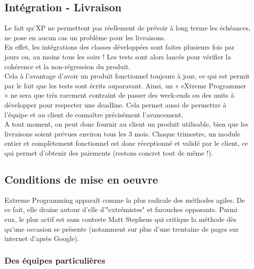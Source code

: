 \documentclass[]{article}
\begin{document}
\hypertarget{intuxe9gration---livraison}{%
\subsection{\texorpdfstring{\textbf{Intégration -
Livraison}}{Intégration - Livraison}}\label{intuxe9gration---livraison}}

Le fait qu'XP ne permettent pas réellement de prévoir à long terme les
échéances, ne pose en aucun cas un problème pour les livraisons.\\
En effet, les intégrations des classes développées sont faites plusieurs
fois par jours ou, au moins tous les soirs ! Les tests sont alors lancés
pour vérifier la cohérence et la non-régression du produit.\\
Cela à l'avantage d'avoir un produit fonctionnel toujours à jour, ce qui
est permit par le fait que les tests sont écrits auparavant. Ainsi, un «
eXtreme Programmer » ne sera que très rarement contraint de passer des
week-ends ou des nuits à développer pour respecter une deadline. Cela
permet aussi de permettre à l'équipe et au client de connaître
précisément l'avancement.\\
A tout moment, on peut donc fournir au client un produit utilisable,
bien que les livraisons soient prévues environ tous les 3 mois. Chaque
trimestre, un module entier et complètement fonctionnel est donc
réceptionné et validé par le client, ce qui permet d'obtenir des
paiements (restons concret tout de même !).




\hypertarget{conditions-de-mise-en-oeuvre}{%
\subsection{\texorpdfstring{\textbf{Conditions de mise en
oeuvre}}{Conditions de mise en oeuvre}}\label{conditions-de-mise-en-oeuvre}}

Extreme Programming apparaît comme la plus radicale des méthodes agiles.
De ce fait, elle draine autour d'elle d'"extrémistes" et farouches
opposants. Parmi eux, le plus actif est sans conteste Matt Stephens qui
critique la méthode dès qu'une occasion se présente (notamment sur plus
d'une trentaine de pages sur internet d'après Google).




\hypertarget{des-uxe9quipes-particuliuxe8res}{%
\subsubsection{Des équipes
particulières}\label{des-uxe9quipes-particuliuxe8res}}
\end{document}
